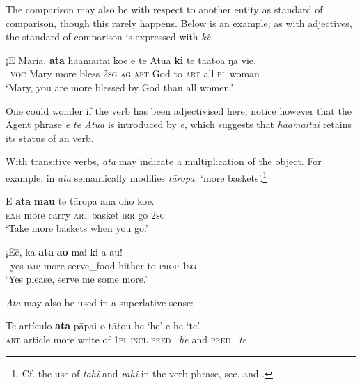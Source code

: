 The comparison may also be with respect to another entity as standard of comparison, though this rarely happens. Below is an example; as with adjectives, the standard of comparison is expressed with \textit{ki}:

\ea\label{ex:7.94}
\gll ¡E Māria, \textbf{{\ꞌ}ata} ha{\ꞌ}amaitai koe e te {\ꞌ}Atua \textbf{ki} te ta{\ꞌ}ato{\ꞌ}a ŋā vi{\ꞌ}e. \\
~\textsc{voc} Mary more bless \textsc{2sg} \textsc{ag} \textsc{art} God to \textsc{art} all \textsc{pl} woman \\

\glt
‘Mary, you are more blessed by God than all women.’ \textstyleExampleref{[Luke 1:42]}
\z

One could wonder if the verb has been adjectivised here; notice however that the Agent phrase \textit{e te {\ꞌ}Atua} is introduced by \textit{e}, which suggests that \textit{ha{\ꞌ}amaitai} retains its status of an  verb.

With transitive verbs, \textit{{\ꞌ}ata} may indicate a multiplication of the object. For example, in  \textit{{\ꞌ}ata} semantically modifies \textit{tāropa}: ‘more baskets’.\footnote{\label{fn:344}Cf. the use of \textit{tahi} and \textit{rahi} in the verb phrase, sec.  and .}

\ea\label{ex:7.95}
\gll E \textbf{{\ꞌ}ata} \textbf{ma{\ꞌ}u} te tāropa ana oho koe. \\
\textsc{exh} more carry \textsc{art} basket \textsc{irr} go \textsc{2sg} \\

\glt 
‘Take more baskets when you go.’ \textstyleExampleref{[MsE-064.013]}
\z

\ea\label{ex:7.96}
\gll ¡{\ꞌ}Ēē, ka \textbf{{\ꞌ}ata} \textbf{ao} mai ki a au! \\
~yes \textsc{imp} more serve\_food hither to \textsc{prop} \textsc{1sg} \\

\glt
‘Yes please, serve me some more.’ \textstyleExampleref{[R535.098]} 
\z

\textit{{\ꞌ}Ata} may also be used in a superlative sense:

\ea\label{ex:7.97}
\gll Te artículo \textbf{{\ꞌ}ata} pāpa{\ꞌ}i o tātou he ‘he’ {\ꞌ}e he ‘te’. \\
\textsc{art} article more write of \textsc{1pl.incl} \textsc{pred} \textit{~he} and \textsc{pred} \textit{~te} \\

